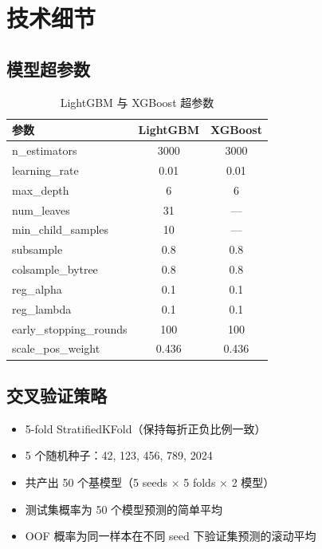 \documentclass[11pt,a4paper]{article}
\begin{document}
\section{技术细节}

\subsection{模型超参数}

\begin{table}[H]
\centering
\caption{LightGBM 与 XGBoost 超参数}
\begin{tabular}{lcc}
\toprule
参数 & LightGBM & XGBoost \\
\midrule
n\_estimators & 3000 & 3000 \\
learning\_rate & 0.01 & 0.01 \\
max\_depth & 6 & 6 \\
num\_leaves & 31 & --- \\
min\_child\_samples & 10 & --- \\
subsample & 0.8 & 0.8 \\
colsample\_bytree & 0.8 & 0.8 \\
reg\_alpha & 0.1 & 0.1 \\
reg\_lambda & 0.1 & 0.1 \\
early\_stopping\_rounds & 100 & 100 \\
scale\_pos\_weight & 0.436 & 0.436 \\
\bottomrule
\end{tabular}
\end{table}

\subsection{交叉验证策略}

\begin{itemize}[nosep]
    \item 5-fold StratifiedKFold（保持每折正负比例一致）
    \item 5 个随机种子：42, 123, 456, 789, 2024
    \item 共产出 50 个基模型（5 seeds $\times$ 5 folds $\times$ 2 模型）
    \item 测试集概率为 50 个模型预测的简单平均
    \item OOF 概率为同一样本在不同 seed 下验证集预测的滚动平均
\end{itemize}
\end{document}
